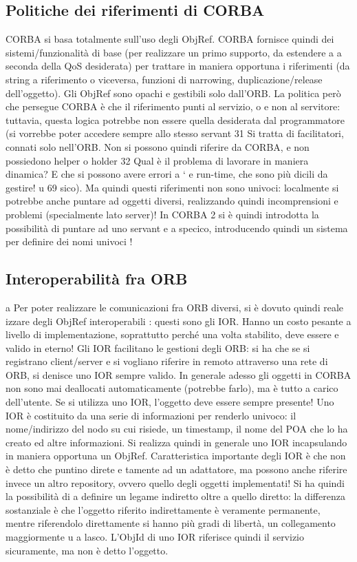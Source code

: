 \subsection{Politiche dei riferimenti di CORBA}
CORBA si basa totalmente sull'uso degli ObjRef. CORBA fornisce quindi dei
sistemi/funzionalità di base (per realizzare un primo supporto, da estendere a
a
seconda della QoS desiderata) per trattare in maniera opportuna i riferimenti
(da string a riferimento o viceversa, funzioni di narrowing, duplicazione/release
dell'oggetto). Gli ObjRef sono opachi e gestibili solo dall'ORB.
La politica però che persegue CORBA è che il riferimento punti al servizio,
o
e
non al servitore: tuttavia, questa logica potrebbe non essere quella desiderata dal programmatore (si vorrebbe poter
accedere sempre allo stesso servant
31 Si tratta di facilitatori, connati solo nell'ORB. Non si possono quindi riferire da CORBA,
e non possiedono helper o holder
32 Qual è il problema di lavorare in maniera dinamica? E che si possono avere errori a
`
e
run-time, che sono più dicili da gestire!
u
69
sico). Ma quindi questi riferimenti non sono univoci: localmente si potrebbe
anche puntare ad oggetti diversi, realizzando quindi incomprensioni e problemi
(specialmente lato server)!
In CORBA 2 si è quindi introdotta la possibilità di puntare ad uno servant
e
a
specico, introducendo quindi un sistema per definire dei nomi univoci !
\subsection{Interoperabilità fra ORB}
a
Per poter realizzare le comunicazioni fra ORB diversi, si è dovuto quindi reale
izzare degli ObjRef interoperabili : questi sono gli IOR. Hanno un costo pesante
a livello di implementazione, soprattutto perché una volta stabilito, deve essere
e
valido in eterno!
Gli IOR facilitano le gestioni degli ORB: si ha che se si registrano client/server
e si vogliano riferire in remoto attraverso una rete di ORB, si denisce uno IOR
sempre valido. In generale adesso gli oggetti in CORBA non sono mai deallocati
automaticamente (potrebbe farlo), ma è tutto a carico dell'utente. Se si utilizza uno IOR, l'oggetto deve essere
sempre presente!
Uno IOR è costituito da una serie di informazioni per renderlo univoco: il nome/indirizzo del nodo su cui risiede, un
timestamp, il nome del POA che lo ha
creato ed altre informazioni. Si realizza quindi in generale uno IOR incapsulando
in maniera opportuna un ObjRef.
Caratteristica importante degli IOR è che non è detto che puntino direte
e
tamente ad un adattatore, ma possono anche riferire invece un altro repository, ovvero quello degli oggetti
implementati! Si ha quindi la possibilità di
a
definire un legame indiretto oltre a quello diretto: la differenza sostanziale è che l'oggetto riferito indirettamente è
veramente permanente, mentre riferendolo direttamente si hanno più gradi di libertà, un collegamento maggiormente
u
a
lasco. L'ObjId di uno IOR riferisce quindi il servizio sicuramente, ma non è detto l'oggetto.
